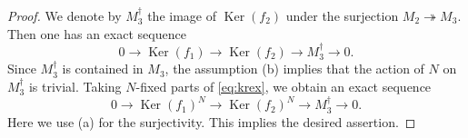 \documentclass[12pt]{amsart}
\theoremstyle{plain}
\theoremstyle{definition}
\numberwithin{thm}{section}
\numberwithin{equation}{section}
\DeclareMathOperator{\Ker}{Ker}
\begin{document}
\begin{proof}
We denote by $M_{3}^{\dagger}$ the image of $\Ker(f_{2})$ under the surjection $M_{2}\twoheadrightarrow M_{3}$. Then one has an exact sequence
\begin{equation}\label{eq:krex}
0\rightarrow \Ker(f_{1})\rightarrow \Ker(f_{2})\rightarrow M_{3}^{\dagger}\rightarrow 0. 
\end{equation}
Since $M^{\dagger}_{3}$ is contained in $M_{3}$, the assumption (b) implies that the action of $N$ on $M_{3}^{\dagger}$ is trivial. Taking $N$-fixed parts of \eqref{eq:krex}, we obtain an exact sequence
\begin{equation*}
0\rightarrow \Ker(f_{1})^{N}\rightarrow \Ker(f_{2})^{N}\rightarrow M_{3}^{\dagger}\rightarrow 0. 
\end{equation*}
Here we use (a) for the surjectivity. This implies the desired assertion. 
\end{proof}
\end{document}
